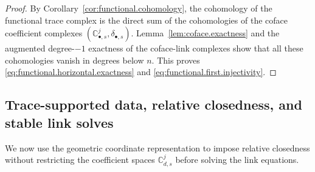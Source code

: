 \documentclass[a4paper,11pt]{article}
\theoremstyle{definition}
\begin{document}
\begin{proof}
By Corollary~\ref{cor:functional.cohomology}, the cohomology of the functional trace complex is the direct sum of the cohomologies of the coface coefficient complexes $\left( \mathbb C_{\bullet,s}^j, \delta_{\bullet,s} \right)$.
Lemma~\ref{lem:coface.exactness} and the augmented degree-$-1$ exactness of the coface-link complexes show that all these cohomologies vanish in degrees below $n$.
This proves \eqref{eq:functional.horizontal.exactness} and \eqref{eq:functional.first.injectivity}.
\end{proof}

\subsection{Trace-supported data, relative closedness, and stable link solves}
\label{subsubsec:relative.closedness}

We now use the geometric coordinate representation to impose relative closedness without restricting the coefficient spaces $\mathbb C_{d,s}^j$ before solving the link equations.
\end{document}
